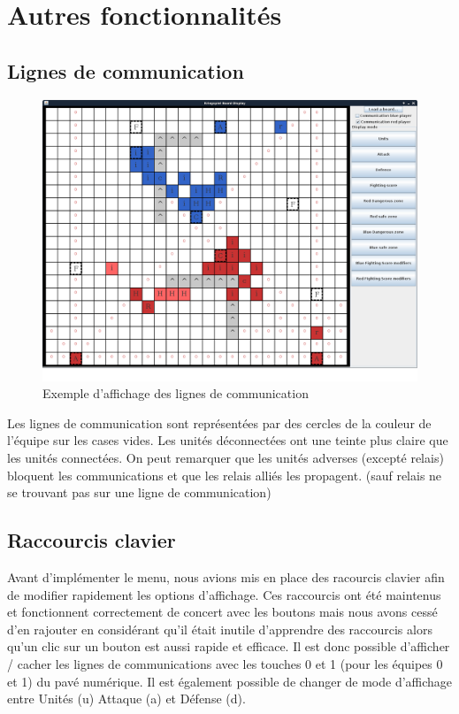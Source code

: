 	\section{Autres fonctionnalités}

		\subsection{Lignes de communication}

			\begin{figure}[!h]
			\centerline{\includegraphics[scale=0.35]{images/screen_com.png}}
			\caption{Exemple d'affichage des lignes de communication}
			\end{figure}
			Les lignes de communication sont représentées par des cercles de la couleur de l'équipe sur les cases vides.
			Les unités déconnectées ont une teinte plus claire que les unités connectées.
			On peut remarquer que les unités adverses (excepté relais) bloquent les communications et que les relais alliés les propagent. 
			(sauf relais ne se trouvant pas sur une ligne de communication)
			
			\clearpage

		\subsection{Raccourcis clavier}
			Avant d'implémenter le menu, nous avions mis en place des racourcis clavier afin de modifier rapidement les options d'affichage.
			Ces raccourcis ont été maintenus et fonctionnent correctement de concert avec les boutons mais nous avons cessé d'en rajouter 
			en considérant qu'il était inutile d'apprendre des raccourcis alors qu'un clic sur un bouton est aussi rapide et efficace.
			Il est donc possible d'afficher / cacher les lignes de communications avec les touches 0 et 1 (pour les équipes 0 et 1) du pavé numérique.
			Il est également possible de changer de mode d'affichage entre Unités (u) Attaque (a) et Défense (d).
